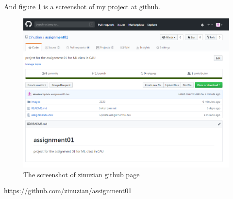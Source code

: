 \documentclass{article}
\begin{document}
And figure \ref{fig:screenshot} is a screenshot of my project at github.
\begin{figure}[h!]
\centering
\includegraphics[scale=0.5]{sc}
\caption{The screenshot of zinuzian github page}
\label{fig:screenshot}
\end{figure}


\begin{thebibliography}{99}
     https://github.com/zinuzian/assignment01
\end{thebibliography}
\end{document}
